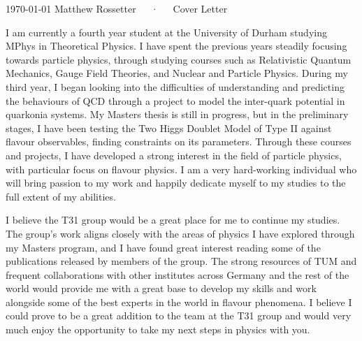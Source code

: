 \documentclass[11pt, a4paper]{awesome-cv}
\newcommand\research{T31 group }
\newcommand\country{Germany }
\newcommand\uni{TUM }
\begin{document}
\makecvheader[R]

\makecvfooter
  {\today}
  {Matthew Rossetter~~~·~~~Cover Letter}
  {}

\makelettertitle

\begin{cvletter}

I am currently a fourth year student at the University of Durham studying MPhys in Theoretical Physics. 
I have spent the previous years steadily focusing towards particle physics, through studying courses such as Relativistic Quantum Mechanics, Gauge Field Theories, and Nuclear and Particle Physics. 
During my third year, I began looking into the difficulties of understanding and predicting the behaviours of QCD through a project to model the inter-quark potential in quarkonia systems.
My Masters thesis is still in progress, but in the preliminary stages, I have been testing the Two Higgs Doublet Model of Type II against flavour observables, finding constraints on its parameters. 
Through these courses and projects, I have developed a strong interest in the field of particle physics, with particular focus on flavour physics. 
I am a very hard-working individual who will bring passion to my work and happily dedicate myself to my studies to the full extent of my abilities. 


\lettersection{Why \research?}
I believe the \research would be a great place for me to continue my studies.
The group's work aligns closely with the areas of physics I have explored through my Masters program, and I have found great interest reading some of the publications released by members of the group.
The strong resources of \uni and frequent collaborations with other institutes across \country and the rest of the world would provide me with a great base to develop my skills and work alongside some of the best experts in the world in flavour phenomena. 
I believe I could prove to be a great addition to the team at the \research and would very much enjoy the opportunity to take my next steps in physics with you. 


\end{cvletter}
\end{document}
